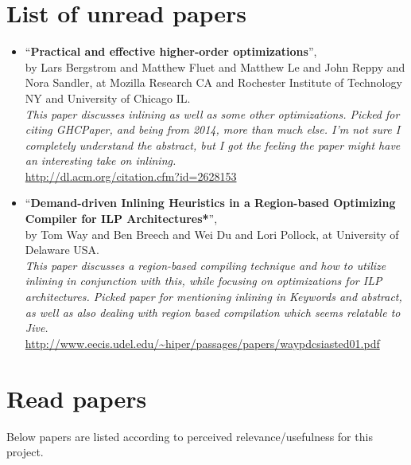 
\section{List of unread papers}

\begin{itemize}

	\item ``\textbf{Practical and effective higher-order optimizations}'', \\ by
Lars Bergstrom and Matthew Fluet and Matthew Le and John Reppy and Nora Sandler,
at Mozilla Research CA and Rochester Institute of Technology NY and University
of Chicago IL. \\
\textit{This paper discusses inlining as well as some other optimizations.
Picked for citing GHCPaper, and being from 2014, more than much else.
I'm not sure I completely understand the abstract, but I got the feeling the
paper might have an interesting take on inlining.} \\
\url{http://dl.acm.org/citation.cfm?id=2628153}

	\item ``\textbf{Demand-driven Inlining Heuristics in a Region-based
Optimizing Compiler for ILP Architectures*}'', \\ by Tom Way and Ben Breech and
Wei Du and Lori Pollock, at University of Delaware USA. \\
\textit{This paper discusses a region-based compiling technique and how to
utilize inlining in conjunction with this, while focusing on optimizations for
ILP architectures. Picked paper for mentioning inlining in Keywords and
abstract, as well as also dealing with region based compilation which seems
relatable to Jive.} \\
\url{http://www.eecis.udel.edu/~hiper/passages/papers/waypdcsiasted01.pdf}

\end{itemize}

\section{Read papers}

Below papers are listed according to perceived relevance/usefulness for this
project.\\


